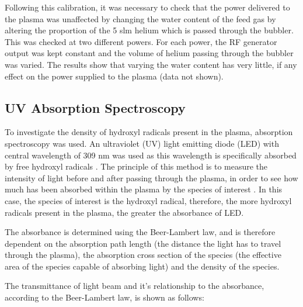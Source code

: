 \documentclass[11pt, oneside]{article}   	%
\begin{document}
Following this calibration, it was necessary to check that the power delivered to the plasma was unaffected by changing the water content of the feed gas by altering the proportion of the 5 slm helium which is passed through the bubbler.
This was checked at two different powers. 
For each power, the RF generator output was kept constant and the volume of helium passing through the bubbler was varied.
The results show that varying the water content has very little, if any effect on the power supplied to the plasma (data not shown).


\subsection{UV Absorption Spectroscopy} \label{sec:AbsorptionSpec}

To investigate the density of hydroxyl radicals present in the plasma, absorption spectroscopy was used. An ultraviolet (UV) light emitting diode (LED) with central wavelength of 309 nm was used as this wavelength is specifically absorbed by free hydroxyl radicals \cite{Hatano2010}.
The principle of this method is to measure the intensity of light before and after passing through the plasma, in order to see how much has been absorbed within the plasma by the species of interest \cite{ReuterSSH2015}.
In this case, the species of interest is the hydroxyl radical, therefore, the more hydroxyl radicals present in the plasma, the greater the absorbance of LED.

The absorbance is determined using the Beer-Lambert law, and is therefore dependent on the absorption path length (the distance the light has to travel through the plasma), the absorption cross section of the species (the effective area of the species capable of absorbing light) and the density of the species.

The transmittance of light beam and it's relationship to the absorbance, according to the Beer-Lambert law, is shown as follows:
\end{document}
